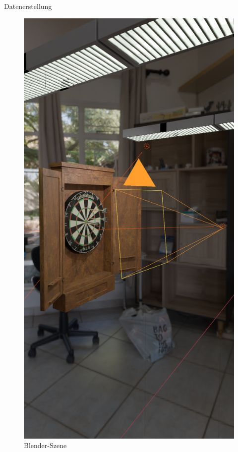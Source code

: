 \begin{frame}{Datenerstellung}
    \begin{figure}
        \centering
        \includegraphics[height=0.6\textheight]{imgs/blender.png}
        \caption{Blender-Szene}
    \end{figure}
\end{frame}

